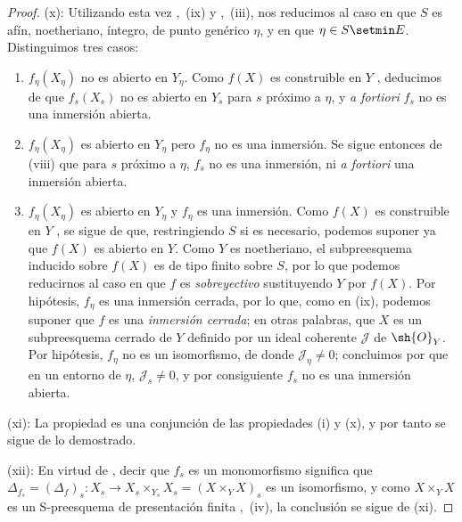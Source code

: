 \begin{proof}
(x): Utilizando esta vez ,~(ix) y ,~(iii), nos reducimos al caso en que $S$ es afín, noetheriano, íntegro, de punto genérico $\eta$, y en que $\eta\in S\setmin E$.
Distinguimos tres casos:
\begin{enumerate}[label=\upshape{$\arabic{enumi}^\circ$}]
  \item $f_\eta(X_\eta)$ no es abierto en $Y_\eta$.
  Como $f(X)$ es construible en $Y$ , deducimos de  que $f_s(X_s)$ no es abierto en $Y_s$ para $s$ próximo a $\eta$, y \emph{a fortiori} $f_s$ no es una inmersión abierta.

  \item $f_\eta(X_\eta)$ es abierto en $Y_\eta$ pero $f_\eta$ no es una inmersión.
  Se sigue entonces de (viii) que para $s$ próximo a $\eta$, $f_s$ no es una inmersión, ni \emph{a fortiori} una inmersión abierta.

  \item $f_\eta(X_\eta)$ es abierto en $Y_\eta$ y $f_\eta$ es una inmersión.
  Como $f(X)$ es construible en $Y$ , se sigue de  que, restringiendo $S$ si es necesario, podemos suponer ya que $f(X)$ es abierto en $Y$.
  Como $Y$ es noetheriano, el subpreesquema inducido sobre $f(X)$ es de tipo finito sobre $S$, por lo que podemos reducirnos al caso en que $f$ es \emph{sobreyectivo} sustituyendo $Y$ por $f(X)$.
  Por hipótesis, $f_\eta$ es una inmersión cerrada, por lo que, como en (ix), podemos suponer que $f$ es una \emph{inmersión cerrada}; en otras palabras, que $X$ es un subpreesquema cerrado de $Y$ definido por un ideal coherente $\mathscr{J}$ de $\sh{O}_Y$.
  Por hipótesis, $f_\eta$ no es un isomorfismo, de donde $\mathscr{J}_\eta\neq 0$; concluimos por  que en un entorno de $\eta$, $\mathscr{J}_s\neq 0$, y por consiguiente $f_s$ no es una inmersión abierta.
\end{enumerate}

(xi): La propiedad es una conjunción de las propiedades (i) y (x), y por tanto se sigue de lo demostrado.

(xii): En virtud de , decir que $f_s$ es un monomorfismo significa que $\Delta_{f_s}=(\Delta_f)_s:X_s\to X_s\times_{Y_s} X_s=(X\times_Y X)_s$ es un isomorfismo, y como $X\times_Y X$ es un S-preesquema de presentación finita ,~(iv), la conclusión se sigue de (xi).
\end{proof}

